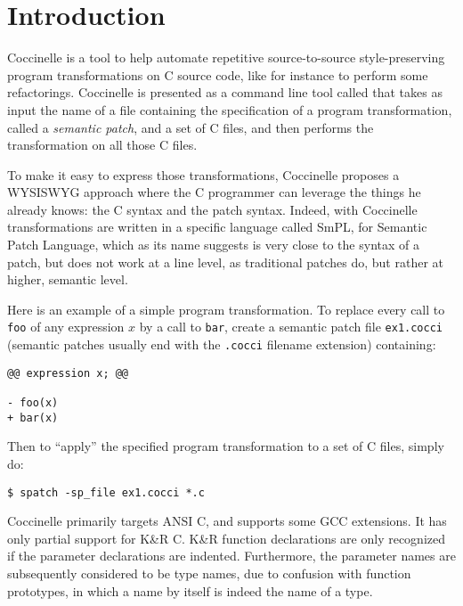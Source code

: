 \chapter{Introduction}

Coccinelle is a tool to help automate repetitive
source-to-source style-preserving program transformations
on C source code, like for instance to perform some refactorings.
Coccinelle is presented as a command line tool called \spatch that takes
as input the name of a file containing the specification of a program
transformation, called a {\em semantic patch}, and a set of C files,
and then performs the transformation on all those C files.

To make it easy to express those transformations,
Coccinelle proposes a WYSISWYG approach where the C programmer
can leverage the things he already knows: the C syntax
and the patch syntax. Indeed, with Coccinelle transformations
are written in a specific language called SmPL, for
Semantic Patch Language, which as its name suggests is very
close to the syntax of a patch, but does not
work at a line level, as traditional patches do,
but rather at higher, semantic level.

Here is an example of a simple program transformation.
To replace every call to \verb+foo+ of any expression $x$
by a call to \verb+bar+, create a semantic patch file \verb+ex1.cocci+
(semantic patches usually end with the \verb+.cocci+  filename extension)
containing:
\begin{verbatim}
@@ expression x; @@

- foo(x)
+ bar(x)

\end{verbatim}

Then to ``apply'' the specified program transformation to a set of C files,
simply do:
\begin{verbatim}
$ spatch -sp_file ex1.cocci *.c
\end{verbatim}


Coccinelle primarily targets ANSI C, and supports some GCC extensions.  It
has only partial support for K\&R C.  K\&R function declarations are only
recognized if the parameter declarations are indented.  Furthermore, the
parameter names are subsequently considered to be type names, due to
confusion with function prototypes, in which a name by itself is indeed the
name of a type.








